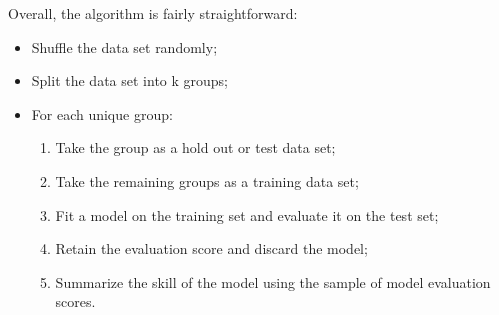 Overall, the algorithm is fairly straightforward:
\begin{itemize}
    \item Shuffle the data set randomly;
    \item Split the data set into k groups;
    \item For each unique group:
    \begin{enumerate}
        \item Take the group as a hold out or test data set;
        \item Take the remaining groups as a training data set;
        \item Fit a model on the training set and evaluate it on the test set;
        \item Retain the evaluation score and discard the model;
        \item Summarize the skill of the model using the sample of model evaluation scores.
    \end{enumerate}
\end{itemize}



